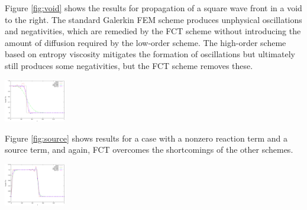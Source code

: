 Figure \ref{fig:void} shows the results for propagation of a square wave
front in a void to the right. The standard Galerkin FEM scheme produces unphysical
oscillations and negativities, which are remedied by the FCT scheme without
introducing the amount of diffusion required by the low-order scheme. The
high-order scheme based on entropy viscosity mitigates the formation of
oscillations but ultimately still produces some negativities, but the
FCT scheme removes these.

\begin{tikzfigure}
  \includegraphics[width=0.20\textwidth]{figures/solutions_3_SSPRK33.pdf}
\end{tikzfigure}

Figure \ref{fig:source} shows results for a case with a nonzero reaction
term and a source term, and again, FCT overcomes the shortcomings of the
other schemes.

\begin{tikzfigure}
  \includegraphics[width=0.20\textwidth]{figures/solutions_8_SSPRK33.pdf}
\end{tikzfigure}

